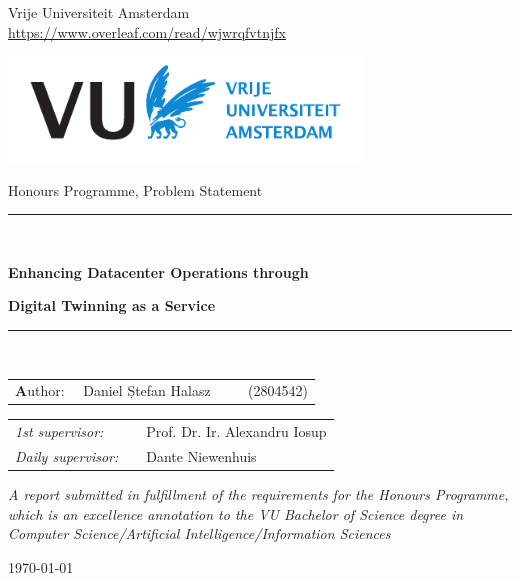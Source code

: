 \thispagestyle{empty}
\begin{center}
    \vspace*{0.7cm}

    Vrije Universiteit Amsterdam \\
    \url{https://www.overleaf.com/read/wjwrqfvtnjfx}

    {\includegraphics[height=28mm]{style/vu-griffioen-white}}
    \vspace{1cm}

    {\Large Honours Programme, Problem Statement}
    \vspace{1cm}

    \rule{.9\linewidth}{.6pt}\\[0.4cm]
    {
        \huge \bfseries Enhancing Datacenter Operations through\par
    }
    \vspace{-0.2cm}
    {
        \huge \bfseries Digital Twinning as a Service\par
    }
    \rule{.9\linewidth}{.6pt}\\[2.5cm]

    {
        \Large
        \begin{tabular}{l}
        {\textbf Author:}
            ~~Daniel Ștefan Halasz ~~~~ (2804542)
        \end{tabular}
    }


    \begin{tabular}{ll}
        \textit{1st supervisor:}
        & ~~Prof. Dr. Ir. Alexandru Iosup \\
        \textit{Daily supervisor:} & ~~Dante Niewenhuis~~~~          \\
    \end{tabular}

    \vspace{2.8cm}

    \textit{A report submitted in fulfillment of the requirements for the Honours Programme,\\
    which is an excellence annotation to the VU Bachelor of Science degree in\\
    Computer Science/Artificial Intelligence/Information Sciences}

    \today\\[4cm]
\end{center}
